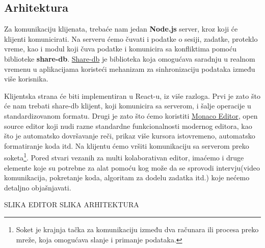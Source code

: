 \documentclass[12pt]{article}
\begin{document}
\subsection{Arhitektura}

Za komunikaciju klijenata, trebaće nam jedan \textbf{Node.js} server, kroz koji će klijenti komunicirati. Na serveru ćemo čuvati i podatke o sesiji, zadatke, proteklo vreme, kao i modul koji čuva podatke i komunicira sa konfliktima pomoću biblioteke \textbf{share-db}. \href{https://share.github.io/sharedb/}{Share-db} je biblioteka koja omogućava saradnju u realnom vremenu u aplikacijama koristeći mehanizam za sinhronizaciju podataka između više korisnika. 

Klijentska strana će biti implementiran u React-u, iz više razloga. Prvi je zato što će nam trebati share-db klijent, koji komunicira sa serverom, i šalje operacije u standardizovanom formatu. Drugi je zato što ćemo koristiti \href{https://microsoft.github.io/monaco-editor/}{Monaco Editor}, open source editor koji nudi razne standardne funkcionalnosti modernog editora, kao što je automatsko dovršavanje reči, prikaz više kursora istovremeno, automatsko formatiranje koda itd. Na klijentu ćemo vršiti komunikaciju sa serverom preko soketa\footnote{Soket je krajnja tačka za komunikaciju između dva računara ili procesa preko mreže, koja omogućava slanje i primanje podataka.}. Pored stvari vezanih za multi kolaborativan editor, imaćemo i druge elemente koje su potrebne za alat pomoću kog može da se sprovodi intervju(video komunikacija, pokretanje koda, algoritam za dodelu zadatka itd.) koje nećemo detaljno objašnjavati.

SLIKA EDITOR
SLIKA ARHITEKTURA
\end{document}
